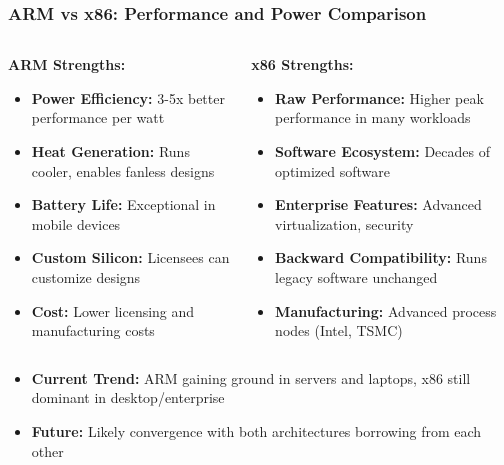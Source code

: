 \begin{frame}
\frametitle{ARM vs x86: Performance and Power Comparison}
\begin{columns}[T]
\begin{column}{0.48\textwidth}
\textbf{ARM Strengths:}
\begin{itemize}
    \item \textbf{Power Efficiency:} 3-5x better performance per watt
    \item \textbf{Heat Generation:} Runs cooler, enables fanless designs
    \item \textbf{Battery Life:} Exceptional in mobile devices
    \item \textbf{Custom Silicon:} Licensees can customize designs
    \item \textbf{Cost:} Lower licensing and manufacturing costs
\end{itemize}
\end{column}
\begin{column}{0.48\textwidth}
\textbf{x86 Strengths:}
\begin{itemize}
    \item \textbf{Raw Performance:} Higher peak performance in many workloads
    \item \textbf{Software Ecosystem:} Decades of optimized software
    \item \textbf{Enterprise Features:} Advanced virtualization, security
    \item \textbf{Backward Compatibility:} Runs legacy software unchanged
    \item \textbf{Manufacturing:} Advanced process nodes (Intel, TSMC)
\end{itemize}
\end{column}
\end{columns}
\begin{itemize}
    \item \textbf{Current Trend:} ARM gaining ground in servers and laptops, x86 still dominant in desktop/enterprise
    \item \textbf{Future:} Likely convergence with both architectures borrowing from each other
\end{itemize}
\end{frame}

